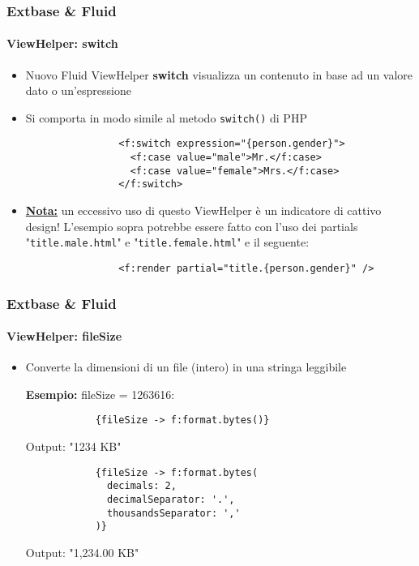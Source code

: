 \begin{frame}[fragile]
	\frametitle{Extbase \& Fluid}
	\framesubtitle{ViewHelper: switch}

	\lstset{
		basicstyle=\smaller\ttfamily
	}

	\begin{itemize}
		\item Nuovo Fluid ViewHelper \textbf{switch} visualizza un contenuto in base ad un valore dato o un'espressione
		\item Si comporta in modo simile al metodo \texttt{switch()} di PHP

			\begin{lstlisting}
				<f:switch expression="{person.gender}">
				  <f:case value="male">Mr.</f:case>
				  <f:case value="female">Mrs.</f:case>
				</f:switch>
			\end{lstlisting}

		\item \textbf{\underline{Nota:}} un eccessivo uso di questo ViewHelper è un indicatore di cattivo design! L'esempio sopra potrebbe essere fatto con l'uso dei partials "\texttt{title.male.html}" e "\texttt{title.female.html}" e il seguente:

			\begin{lstlisting}
				<f:render partial="title.{person.gender}" />
			\end{lstlisting}

	\end{itemize}

\end{frame}


\begin{frame}[fragile]
	\frametitle{Extbase \& Fluid}
	\framesubtitle{ViewHelper: fileSize}

	\lstset{
		basicstyle=\smaller\ttfamily
	}

	\begin{itemize}
		\item Converte la dimensioni di un file (intero) in una stringa leggibile\newline

			\smaller\textbf{Esempio:} fileSize = 1263616:\normalsize
			\begin{lstlisting}
			{fileSize -> f:format.bytes()}
			\end{lstlisting}
			\smaller Output: "1234 KB"\normalsize\newline
			\begin{lstlisting}
			{fileSize -> f:format.bytes(
			  decimals: 2,
			  decimalSeparator: '.',
			  thousandsSeparator: ','
			)}
			\end{lstlisting}
			\smaller Output: "1,234.00 KB"\normalsize

	\end{itemize}

\end{frame}

